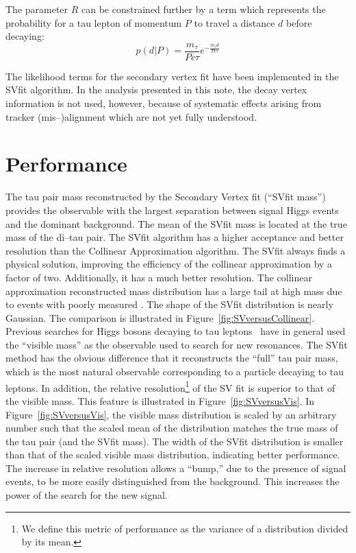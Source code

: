The parameter $R$ can be constrained further by a term which represents the
probability for a tau lepton of momentum $P$ to travel a distance $d$ before
decaying:
\begin{equation*}
p \left( d | P \right) = \frac{m_\tau}{P c\tau}e^{-\frac{m_\tau d}{P c\tau}}
\end{equation*}

The likelihood terms for the secondary vertex fit have been implemented in the
SVfit algorithm.  In the analysis presented in this note, the decay vertex
information is not used, however, because of systematic effects arising from
tracker (mis--)alignment which are not yet fully understood.

\section{Performance}

The tau pair mass reconstructed by the Secondary Vertex fit (``SVfit mass'')
provides the observable with the largest separation between signal Higgs events
and the dominant \ZTT background.  The mean of the SVfit mass is located at the
true mass of the di--tau pair.  The SVfit algorithm has a higher acceptance and
better resolution than the Collinear Approximation algorithm.  The SVfit always
finds a physical solution, improving the efficiency of the collinear
approximation by a factor of two.  Additionally, it has a much better
resolution.  The collinear approximation reconstructed mass distribution has a
large tail at high mass due to events with poorly measured \MET\@.  The shape of
the SVfit distribution is nearly Gaussian.  The comparison is illustrated in
Figure~\ref{fig:SVversusCollinear}.  Previous searches for Higgs bosons decaying
to tau leptons~\cite{CDFMSSMHiggs} have in general used the ``visible mass'' as the
observable used to search for new resonances.  The SVfit method has the obvious
difference that it reconstructs the ``full'' tau pair mass, which is the most
natural observable corresponding to a particle decaying to tau leptons.  In
addition, the relative resolution\footnote{We define this metric of performance
as the variance of a distribution divided by its mean.}
of the SV fit is superior to that of the visible mass.  This feature is
illustrated in Figure~\ref{fig:SVversusVis}.  In Figure~\ref{fig:SVversusVis},
the visible mass distribution is scaled by an arbitrary number such that the
scaled mean of the distribution matches the true mass of the tau pair (and the
SVfit mass).  The width of the SVfit distribution is smaller than that of
the scaled visible mass distribution, indicating better performance.  The
increase in relative resolution allows a ``bump,'' due to the presence of signal
events, to be more easily distinguished from the \ZTT background.  This
increases the power of the search for the new signal.

